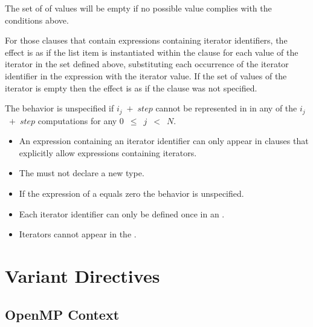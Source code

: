 The set of of values will be empty if no possible value complies with the conditions above.

For those clauses that contain expressions containing iterator identifiers, the
effect is as if the list item is instantiated within the clause for each value
of the iterator in the set defined above, substituting each occurrence of the
iterator identifier in the expression with the iterator value. If the set of
values of the iterator is empty then the effect is as if the clause was not
specified.

The behavior is unspecified if $i_{j}$~$+$~$step$ cannot be represented in 
 in any of the $i_{j}$~$+$~$step$ computations for any 
$0$~$\leq$~$j$~$<$~$N$.

\restrictions

\begin{itemize}
\item An expression containing an iterator identifier can only appear in clauses that explicitly allow expressions containing iterators.
\item The  must not declare a new type.
\item If the  expression of a  equals zero the behavior is unspecified.
\item Each iterator identifier can only be defined once in an .
\item Iterators cannot appear in the .
\end{itemize}


\section{Variant Directives}
\label{sec:Variant Directives}

\subsection{OpenMP Context}
\label{subsec:OpenMP Context}


